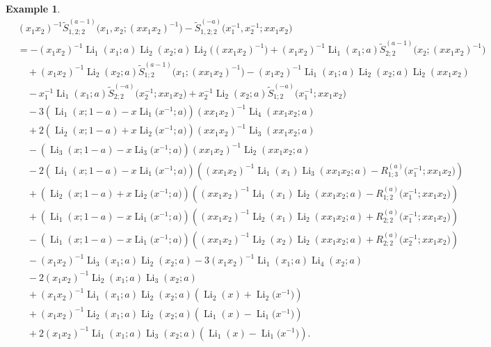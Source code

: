 \documentclass[11pt]{article}
\DeclareMathOperator{\Li}{Li}
\theoremstyle{plain}
\theoremstyle{definition}
\newtheorem{exa}[thm]{Example}
\begin{document}
\begin{exa}
\begin{align*}
	&(x_1x_2)^{-1}\tilde{S}^{(a-1)}_{1,2;2}\Big(x_1,x_2;(xx_1x_2)^{-1}\Big)-\tilde{S}^{(-a)}_{1,2;2}\Big(x_1^{-1},x_2^{-1};xx_1x_2\Big)\\
	&=-(x_1x_2)^{-1}\Li_{1}(x_1;a)\Li_{2}(x_2;a)\Li_2\Big((xx_1x_2)^{-1}\Big)+(x_1x_2)^{-1}\Li_{1}(x_1;a)\tilde{S}^{(a-1)}_{2;2}\Big(x_2;(xx_1x_2)^{-1}\Big)\nonumber\\
	&\quad+(x_1x_2)^{-1}\Li_{2}(x_2;a)\tilde{S}^{(a-1)}_{1;2}\Big(x_1;(xx_1x_2)^{-1}\Big)-(x_1x_2)^{-1}\Li_{1}(x_1;a)\Li_{2}(x_2;a)\Li_2(xx_1x_2)\nonumber\\
	&\quad-x_1^{-1}\Li_{1}(x_1;a)\tilde{S}^{(-a)}_{2;2}\Big(x_2^{-1};xx_1x_2\Big)+x_2^{-1}\Li_{2}(x_2;a)\tilde{S}^{(-a)}_{1;2}\Big(x_1^{-1};xx_1x_2\Big)\nonumber\\
	&\quad-3\left(\Li_{1}(x;1-a)-x\Li_{1}\Big(x^{-1};a\Big)\right)(xx_1x_2)^{-1}\Li_{4}(xx_1x_2;a)\nonumber\\
	&\quad+2\left(\Li_{2}(x;1-a)+x\Li_{2}\Big(x^{-1};a\Big)\right)(xx_1x_2)^{-1}\Li_{3}(xx_1x_2;a)\nonumber\\
	&\quad-\left(\Li_{3}(x;1-a)-x\Li_{3}\Big(x^{-1};a\Big)\right)(xx_1x_2)^{-1}\Li_2(xx_1x_2;a)\nonumber\\
	&\quad-2\left(\Li_{1}(x;1-a)-x\Li_{1}\Big(x^{-1};a\Big)\right)\left((xx_1x_2)^{-1}\Li_{1}(x_1)\Li_{3}(xx_1x_2;a)-R^{(a)}_{1;3}\Big(x_1^{-1};xx_1x_2\Big)\right)\nonumber\\
	&\quad+\left(\Li_{2}(x;1-a)+x\Li_{2}\Big(x^{-1};a\Big)\right)\left((xx_1x_2)^{-1}\Li_{1}(x_1)\Li_{2}(xx_1x_2;a)-R^{(a)}_{1;2}\Big(x_1^{-1};xx_1x_2\Big)\right)\nonumber\\
	&\quad+\left(\Li_{1}(x;1-a)-x\Li_{1}\Big(x^{-1};a\Big)\right)\left((xx_1x_2)^{-1}\Li_{2}(x_1)\Li_{2}(xx_1x_2;a)+R^{(a)}_{2;2}\Big(x_1^{-1};xx_1x_2\Big)\right)\nonumber\\
	&\quad-\left(\Li_{1}(x;1-a)-x\Li_{1}\Big(x^{-1};a\Big)\right)\left((xx_1x_2)^{-1}\Li_{2}(x_2)\Li_{2}(xx_1x_2;a)+R^{(a)}_{2;2}\Big(x_2^{-1};xx_1x_2\Big)\right)\nonumber\\
	&\quad-(x_1x_2)^{-1}\Li_{3}(x_1;a)\Li_{2}(x_2;a)-3(x_1x_2)^{-1}\Li_{1}(x_1;a)\Li_{4}(x_2;a)\\
	&\quad-2(x_1x_2)^{-1}\Li_{2}(x_1;a)\Li_{3}(x_2;a)\\
	&\quad+(x_1x_2)^{-1}\Li_{1}(x_1;a)\Li_{2}(x_2;a)\left(\Li_{2}(x)+ \Li_{2}\Big(x^{-1}\Big)\right)\\
	&\quad+(x_1x_2)^{-1}\Li_{2}(x_1;a)\Li_{2}(x_2;a)\left(\Li_{1}(x)-\Li_{1}\Big(x^{-1}\Big)\right)\\
	&\quad+2(x_1x_2)^{-1}\Li_{1}(x_1;a)\Li_{3}(x_2;a)\left(\Li_{1}(x)-\Li_{1}\Big(x^{-1}\Big)\right).
\end{align*}
\end{exa}
\end{document}
